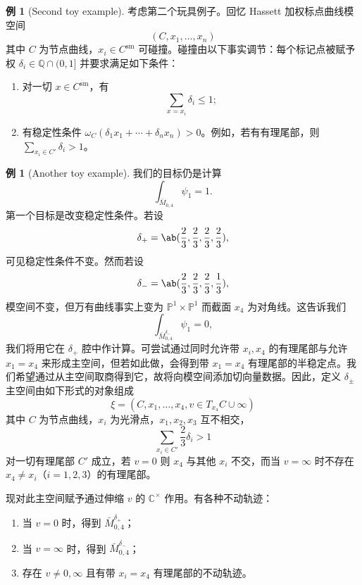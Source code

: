 \documentclass{amsart}
\theoremstyle{definition}
\newtheorem{exm}[thm]{例}
\theoremstyle{remark}
\theoremstyle{plain}
\theoremstyle{definition}
\theoremstyle{remark}
\newcommand{\C}{\mathbb{C}}
\newcommand{\Q}{\mathbb{Q}}
\renewcommand{\P}{\mathbb{P}}
\newcommand{\mr}[1]{\mathrm{#1}}
\newcommand{\1}{\mathbf{1}}
\newcommand{\2}{\mathbf{2}}
\newcommand{\3}{\mathbf{3}}
\begin{document}
\begin{exm}[Second toy example]
    考虑第二个玩具例子。回忆 Hassett 加权标点曲线模空间
    \[ (C, x_1, \ldots, x_n) \]
    其中 \(C\) 为节点曲线，\(x_i \in C^{\mr{sm}}\) 可碰撞。碰撞由以下事实调节：每个标记点被赋予权 \(\delta_i \in \Q \cap (0,1]\) 并要求满足如下条件：
    \begin{enumerate}
        \item 对一切 \(x \in C^{\mr{sm}}\)，有
            \[ \sum_{x = x_i} \delta_i \leq 1; \]
        \item 有稳定性条件 \(\omega_C(\delta_1 x_1 + \cdots + \delta_n x_n) > 0\)。例如，若有有理尾部，则 \(\sum_{x_i \in C'} \delta_i > 1\)。
    \end{enumerate}
\end{exm}

\begin{exm}[Another toy example]
    我们的目标仍是计算
    \[ \int_{\bar{M}_{0,4}} \psi_1 = 1. \]
    第一个目标是改变稳定性条件。若设
    \[ \delta_+ = \ab(\frac{2}{3}, \frac{2}{3}, \frac{2}{3}, \frac{2}{3}), \]
    可见稳定性条件不变。然而若设
    \[ \delta_- = \ab(\frac{2}{3}, \frac{2}{3}, \frac{2}{3}, \frac{1}{3}), \]
    模空间不变，但万有曲线事实上变为 \(\P^1 \times \P^1\) 而截面 \(x_4\) 为对角线。这告诉我们
    \[ \int_{\bar{M}_{0,4}^{\delta_-}} \psi_1 = 0, \]
    我们将用它在 \(\delta_+\) 腔中作计算。可尝试通过同时允许带 \(x_i, x_4\) 的有理尾部与允许 \(x_1 = x_4\) 来形成主空间，但若如此做，会得到带 \(x_1 = x_4\) 有理尾部的半稳定点。我们希望通过从主空间取商得到它，故将向模空间添加切向量数据。因此，定义 \(\delta_{\pm}\) 主空间由如下形式的对象组成
    \[ \xi = (C, x_1, \ldots, x_4, v \in T_{x_4} C \cup \infty) \]
    其中 \(C\) 为节点曲线，\(x_i\) 为光滑点，\(x_1, x_2, x_3\) 互不相交，
    \[ \sum_{x_i \in C'} \frac{2}{3} \delta_i > 1 \]
    对一切有理尾部 \(C'\) 成立，若 \(v = 0\) 则 \(x_4\) 与其他 \(x_i\) 不交，而当 \(v = \infty\) 时不存在 \(x_4 \neq x_i\)（\(i=1,2,3\)）的有理尾部。

    现对此主空间赋予通过伸缩 \(v\) 的 \(\C^{\times}\) 作用。有各种不动轨迹：
    \begin{enumerate}
        \item 当 \(v = 0\) 时，得到 \(\bar{M}_{0,4}^{\delta_+}\)；
        \item 当 \(v = \infty\) 时，得到 \(\bar{M}_{0,4}^{\delta_-}\)；
        \item 存在 \(v \neq 0,\infty\) 且有带 \(x_i = x_4\) 有理尾部的不动轨迹。
    \end{enumerate}


\end{exm}
\end{document}
